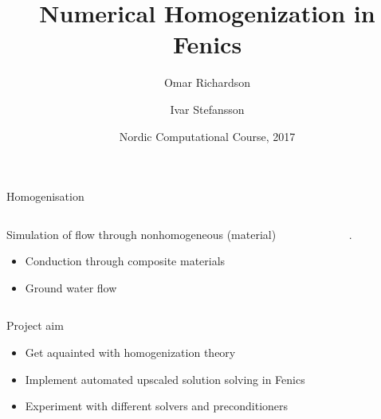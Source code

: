 \documentclass{beamer}
\title[Numerical homogenization]{Numerical Homogenization in Fenics}
\author[O. Richardson \and I. Stefansson] %
{Omar Richardson \and Ivar Stefansson}
\institute %
{
    Karlstad University, Sweden \and University of Bergen, Norway
}
\date[]{Nordic Computational Course, 2017}
\begin{document}
  \frame{\titlepage}
\begin{frame}{Homogenisation}
    \begin{columns}
        \begin{column}[c]{.5\textwidth}
            Simulation of flow through nonhomogeneous (material)
            \begin{itemize}
              \item Conduction through composite materials
              \item Ground water flow
            \end{itemize}
        \end{column}
        \begin{column}[c]{.5\textwidth}
            .
        \end{column}
    \end{columns}
\end{frame}

\begin{frame}[t]{Project aim}
    \begin{itemize}
        \item Get aquainted with homogenization theory
        \item Implement automated upscaled solution solving in Fenics
        \item Experiment with different solvers and preconditioners
    \end{itemize}
\end{frame}
\end{document}
